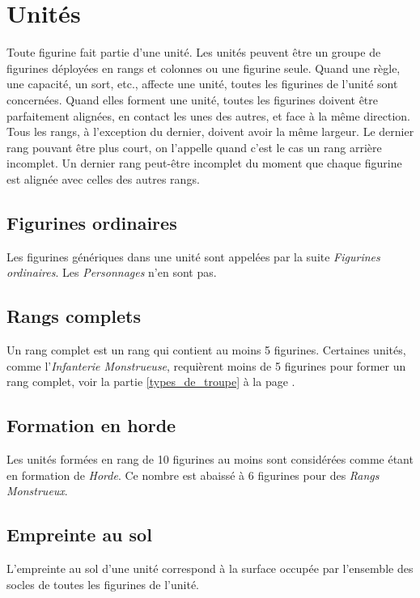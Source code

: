 \section{Unités}

Toute figurine fait partie d'une unité. Les unités peuvent être un groupe de figurines déployées en rangs et colonnes ou une figurine seule. Quand une règle, une capacité, un sort, etc., affecte une unité, toutes les figurines de l'unité sont concernées. Quand elles forment une unité, toutes les figurines doivent être parfaitement alignées, en contact les unes des autres, et face à la même direction. Tous les rangs, à l'exception du dernier, doivent avoir la même largeur. Le dernier rang pouvant être plus court, on l'appelle quand c'est le cas un rang arrière incomplet. Un dernier rang peut-être incomplet du moment que chaque figurine est alignée avec celles des autres rangs. 

\subsection{Figurines ordinaires}

Les figurines génériques dans une unité sont appelées par la suite \emph{Figurines ordinaires}. Les \emph{Personnages} n'en sont pas.

\subsection{Rangs complets}

Un rang complet est un rang qui contient au moins 5 figurines. Certaines unités, comme l'\emph{Infanterie Monstrueuse}, requièrent moins de 5 figurines pour former un rang complet, voir la partie \ref{types_de_troupe} à la page \pageref{types_de_troupe}.

\subsection{Formation en horde}
\label{horde}

Les unités formées en rang de 10 figurines au moins sont considérées comme étant en formation de \emph{Horde}. Ce nombre est abaissé à 6 figurines pour des \emph{Rangs Monstrueux}.

\subsection{Empreinte au sol}

L'empreinte au sol d'une unité correspond à la surface occupée par l'ensemble des socles de toutes les figurines de l'unité.


